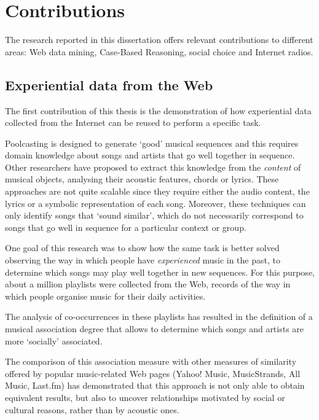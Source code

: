 

\section{Contributions} %

The research reported in this dissertation offers relevant contributions to different areas: Web data mining, Case-Based Reasoning, social choice and Internet radios.

\subsection{Experiential data from the Web} %

The first contribution of this thesis is the demonstration of how experiential data collected from the Internet can be reused to perform a specific task.

Poolcasting is designed to generate `good' musical sequences and this requires domain knowledge about songs and artists that go well together in sequence.
Other researchers have proposed to extract this knowledge from the \emph{content} of musical objects, analysing their acoustic features, chords or lyrics. 
These approaches are not quite scalable since they require either the audio content, the lyrics or a symbolic representation of each song.
Moreover, these techniques can only identify songs that `sound similar', which do not necessarily correspond to songs that go well in sequence for a particular context or group.

One goal of this research was to show how the same task is better solved observing the way in which people have \emph{experienced} music in the past, to determine which songs may play well together in new sequences.
For this purpose, about a million playlists were collected from the Web, records of the way in which people organise music for their daily activities.

The analysis of co-occurrences in these playlists has resulted in the definition of a musical association degree that allows to determine which songs and artists are more `socially' associated.

The comparison of this association measure with other measures of similarity offered by popular music-related Web pages (Yahoo! Music, MusicStrands, All Music, Last.fm) has demonstrated that this approach is not only able to obtain equivalent results, but also to uncover relationships motivated by social or cultural reasons, rather than by acoustic ones.

